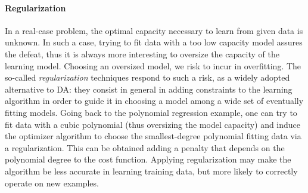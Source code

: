 \begin{figure}
\end{figure}

\paragraph*{Regularization}
In a real-case problem, the optimal capacity necessary to learn from given data is unknown. In such a case, trying to fit data with a too low capacity model assures the defeat, thus it is always more interesting to oversize the capacity of the learning model. Choosing an oversized model, we risk to incur in overfitting. The so-called \emph{regularization} techniques respond to such a risk, as a widely adopted alternative to DA: they consist in general in adding constraints to the learning algorithm in order to guide it in choosing a model among a wide set of eventually fitting models. Going back to the polynomial regression example, one can try to fit data with a cubic polynomial (thus oversizing the model capacity) and induce the optimizer algorithm to choose the smallest-degree polynomial fitting data via a regularization. This can be obtained adding a penalty that depends on the polynomial degree to the cost function. Applying regularization may make the algorithm be less accurate in learning training data, but more likely to correctly operate on new examples.

